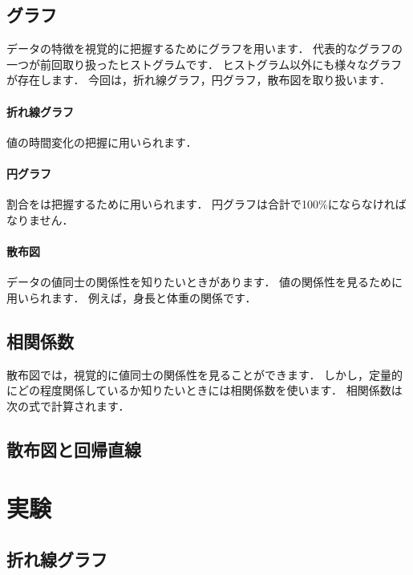 \documentclass[12pt, a4j]{jreport}
\begin{document}
\subsection{グラフ}

データの特徴を視覚的に把握するためにグラフを用います．
代表的なグラフの一つが前回取り扱ったヒストグラムです．
ヒストグラム以外にも様々なグラフが存在します．
今回は，折れ線グラフ，円グラフ，散布図を取り扱います．

\paragraph{折れ線グラフ}

値の時間変化の把握に用いられます．

\paragraph{円グラフ}

割合をは把握するために用いられます．
円グラフは合計で100\%にならなければなりません．

\paragraph{散布図}

データの値同士の関係性を知りたいときがあります．
値の関係性を見るために用いられます．
例えば，身長と体重の関係です．

\subsection{相関係数}

散布図では，視覚的に値同士の関係性を見ることができます．
しかし，定量的にどの程度関係しているか知りたいときには相関係数を使います．
相関係数は次の式で計算されます．

\subsection{散布図と回帰直線}



\section{実験}


\subsection{折れ線グラフ}
\end{document}
